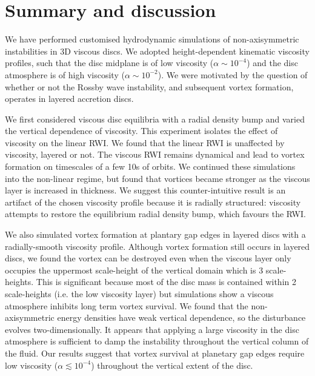 \section{Summary and discussion}\label{summary}
We have performed customised hydrodynamic simulations of
non-axisymmetric instabilities in 3D viscous discs. We adopted
height-dependent kinematic viscosity profiles, such that the disc
midplane is of low viscosity ($\alpha\sim 10^{-4}$) and the disc
atmosphere is of high viscosity ($\alpha\sim 10^{-2}$). We were motivated  
by the question of whether or not the Rossby wave instability, and
subsequent vortex formation, operates in layered accretion discs.  

We first considered viscous disc equilibria with a radial density
bump and varied the vertical dependence of viscosity. 
This experiment isolates the effect of viscosity on the
linear RWI. We found that the linear RWI is unaffected by viscosity,
layered or not. The viscous RWI remains dynamical and lead to vortex
formation on timescales of a few 10s of orbits. We continued these
simulations into the non-linear regime, but found that vortices became
stronger as the viscous layer is increased in thickness. We suggest this
counter-intuitive result is an artifact of the chosen viscosity
profile because it is radially structured: viscosity attempts to
restore the equilibrium radial density bump, which favours the
RWI. 

We also simulated vortex formation at plantary gap edges in layered
discs with a radially-smooth viscosity profile. %
Although vortex formation still 
occurs in layered discs, we found the vortex can be destroyed even when the viscous
layer only occupies the uppermost scale-height of the vertical domain
which is 3 scale-heights. This is significant because most of the disc
mass is contained within 2 scale-heights (i.e. the low viscosity
layer) but simulations show a viscous atmosphere inhibits long term
vortex survival.    
We found that the non-axisymmetric energy densities have
weak vertical dependence, so the disturbance evolves
two-dimensionally. It appears that applying a large viscosity in the
disc atmosphere is sufficient to damp the instability throughout the
vertical column of the fluid. Our results suggest that vortex
survival at planetary gap edges require low viscosity
($\alpha\lesssim10^{-4}$) throughout the vertical extent of the
disc. 

